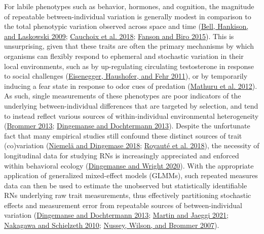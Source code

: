 \documentclass{article}
\begin{document}
For labile phenotypes such as behavior, hormones, and cognition, the
magnitude of repeatable between-individual variation is generally modest
in comparison to the total phenotypic variation observed across space
and time (\protect\hyperlink{ref-Bell2009}{Bell, Hankison, and Laskowski
2009}; \protect\hyperlink{ref-Cauch2018}{Cauchoix et al. 2018};
\protect\hyperlink{ref-Fanson2019}{Fanson and Biro 2015}). This is
unsurprising, given that these traits are often the primary mechanisms
by which organisms can flexibly respond to ephemeral and stochastic
variation in their local environments, such as by up-regulating
circulating testosterone in response to social challenges
(\protect\hyperlink{ref-Eis2011}{Eisenegger, Haushofer, and Fehr 2011}),
or by temporarily inducing a fear state in response to odor cues of
predation (\protect\hyperlink{ref-Mathuru2012}{Mathuru et al. 2012}). As
such, single measurements of these phenotypes are poor indicators of the
underlying between-individual differences that are targeted by
selection, and tend to instead reflect various sources of
within-individual environmental heterogeneity
(\protect\hyperlink{ref-Brommer2013}{Brommer 2013};
\protect\hyperlink{ref-DingDocht2013}{Dingemanse and Dochtermann 2013}).
Despite the unfortunate fact that many empirical studies still confound
these distinct sources of trait (co)variation
(\protect\hyperlink{ref-Niem2018}{Niemelä and Dingemase 2018};
\protect\hyperlink{ref-Roy2018}{Royauté et al. 2018}), the necessity of
longitudinal data for studying RNs is increasingly appreciated and
enforced within behavioral ecology
(\protect\hyperlink{ref-Ding2020}{Dingemanse and Wright 2020}). With the
appropriate application of generalized mixed-effect models (GLMMs), such
repeated measures data can then be used to estimate the unobserved but
statistically identifiable RNs underlying raw trait measurements, thus
effectively partitioning stochastic effects and measurement error from
repeatable sources of between-individual variation
(\protect\hyperlink{ref-DingDocht2013}{Dingemanse and Dochtermann 2013};
\protect\hyperlink{ref-Martin2021}{Martin and Jaeggi 2021};
\protect\hyperlink{ref-Naka2010}{Nakagawa and Schielzeth 2010};
\protect\hyperlink{ref-Nus2007}{Nussey, Wilson, and Brommer 2007}).
\end{document}
